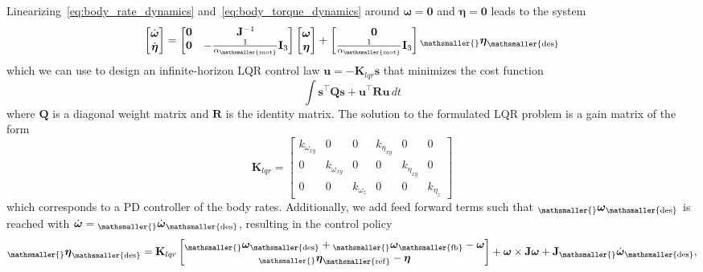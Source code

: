 \documentclass[10pt,a4paper,fleqn]{article}
\newcommand{\bVec}[1]{\mathbf{#1}}
\newcommand{\vect}[3]{{_{\mathsmaller{\mathrm{#2}}}\mathbf{#1}_{\mathsmaller{\mathrm{#3}}}}} %
\newcommand{\vectdot}[3]{{_{\mathsmaller{\mathrm{#2}}}\dot{\mathbf{#1}}_{\mathsmaller{\mathrm{#3}}}}} %
\newcommand{\bodyrate}[0]{\omega} %
\newcommand{\bodyrates}[0]{\boldsymbol{\bodyrate}} %
\newcommand{\inertia}[0]{\bVec{J}} %
\newcommand{\bodytorque}[0]{\eta}
\newcommand{\bodytorques}[0]{\boldsymbol{\bodytorque}}
\newcommand{\motdyn}[0]{\alpha_{\mathsmaller{\mathrm{mot}}}}
\newcommand{\klqr}[0]{\ensuremath{\bVec{K}_{lqr}}}
\newcommand{\lqrstate}[0]{\ensuremath{\bVec{s}}}
\newcommand{\lqrinput}[0]{\ensuremath{\bVec{u}}}
\begin{document}
Linearizing~\eqref{eq:body_rate_dynamics} and~\eqref{eq:body_torque_dynamics} around ${\bodyrates = \bVec{0}}$ and ${\bodytorques = \bVec{0}}$ leads to the system
%
\begin{equation}
	\begin{bmatrix}
		\dot{\bodyrates} \\ 
		\dot{\bodytorques}
	\end{bmatrix}
	=
	\begin{bmatrix}
		\bVec{0} & \inertia^{-1} \\
		\bVec{0} & -\frac{1}{\motdyn} \bVec{I}_3
	\end{bmatrix}
	\begin{bmatrix}
		\bodyrates \\ 
		\bodytorques
	\end{bmatrix}
	+
	\begin{bmatrix}
		\bVec{0} \\
		\frac{1}{\motdyn} \bVec{I}_3
	\end{bmatrix}
	\vect{\bodytorques}{}{des}
	\label{eq:rates_dyn_dystem}
\end{equation}
%
which we can use to design an infinite-horizon LQR control law ${\lqrinput = -\klqr \lqrstate}$ that minimizes the cost function
%
\begin{equation}
	\int \lqrstate^{\top} \bVec{Q} \lqrstate + \lqrinput^{\top} \bVec{R} \lqrinput \, dt
\end{equation}
%
where $\bVec{Q}$ is a diagonal weight matrix and $\bVec{R}$ is the identity matrix.
The solution to the formulated LQR problem is a gain matrix of the form
%
\begin{equation}
	\klqr = \begin{bmatrix}
		k_{\bodyrate_{xy}} & 0 & 0 & k_{\bodytorque_{xy}} & 0 & 0 \\
		0 & k_{\bodyrate_{xy}} & 0 & 0 & k_{\bodytorque_{xy}} & 0 \\
		0 & 0 & k_{\bodyrate_{z}} & 0 & 0 & k_{\bodytorque_{z}}
	\end{bmatrix}
\end{equation}
%
which corresponds to a PD controller of the body rates.
Additionally, we add feed forward terms such that $\vect{\bodyrates}{}{des}$ is reached with ${\dot{\bodyrates} = \vectdot{\bodyrates}{}{des}}$, resulting in the control policy
%
\begin{equation}
	\vect{\bodytorques}{}{des} = \klqr \begin{bmatrix}
		\vect{\bodyrates}{}{des} + \vect{\bodyrates}{}{fb} - \bodyrates \\
		\vect{\bodytorques}{}{ref} - \bodytorques
	\end{bmatrix}
	+ \bodyrates \times \inertia \bodyrates
	+ \inertia \vectdot{\bodyrates}{}{des},
	\label{eq:lqr_controller}
\end{equation}
\end{document}
